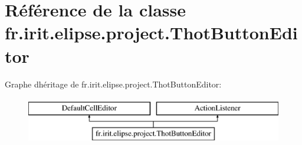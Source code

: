 \hypertarget{classfr_1_1irit_1_1elipse_1_1project_1_1_thot_button_editor}{}\section{Référence de la classe fr.\+irit.\+elipse.\+project.\+Thot\+Button\+Editor}
\label{classfr_1_1irit_1_1elipse_1_1project_1_1_thot_button_editor}
Graphe d\textquotesingle{}héritage de fr.\+irit.\+elipse.\+project.\+Thot\+Button\+Editor\+:\begin{figure}[H]
\begin{center}
\leavevmode
\includegraphics[height=2.000000cm]{classfr_1_1irit_1_1elipse_1_1project_1_1_thot_button_editor}
\end{center}
\end{figure}
